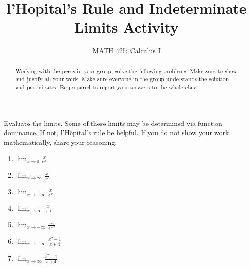 \documentclass{ximera}
\title{l'Hopital's Rule and Indeterminate Limits Activity}
\author{MATH 425: Calculus I}
\begin{document}
\begin{abstract}
   Working with the peers in your group, solve the following problems. Make sure to show and justify all your work. Make sure everyone in the group understands the solution and participates. Be prepared to report your answers to the whole class. 
\end{abstract}
\maketitle


\begin{exercise}
    Evaluate the limits.  Some of these limits may be determined via function dominance.  If not, l'H\^opital's rule  be helpful.  If you do not show your work mathematically, share your reasoning.
\begin{enumerate}
    \item $\lim_{x\rightarrow 0} \frac{x}{e^x}$
    \item $\lim_{x\rightarrow \infty} \frac{x}{e^x}$
    \item $\lim_{x\rightarrow -\infty} \frac{x}{e^x}$
     \item $\lim_{x\rightarrow \infty} \frac{x}{e^{-x}}$
    \item $\lim_{x\rightarrow -\infty} \frac{x}{e^{-x}}$
    \item $\lim_{x\rightarrow -\infty} \frac{x^2-1}{x+4}$
    \item $\lim_{x\rightarrow \infty} \frac{x^2-1}{x+4}$
\end{enumerate}   
\end{exercise}
  
\end{document}
